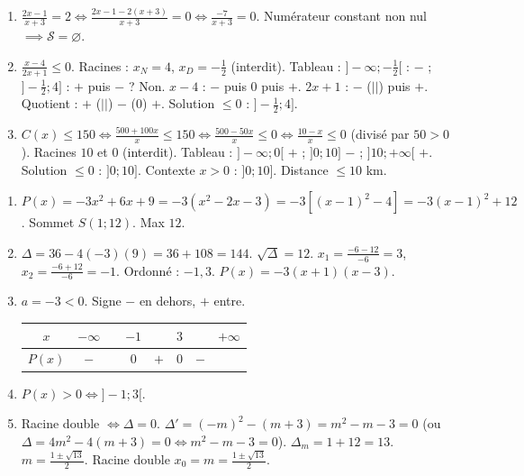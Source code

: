 \documentclass[11pt]{article}
\begin{document}
\begin{corrige}[Exercice 1]
    \begin{enumerate}
        \item $\frac{2x-1}{x+3}=2 \iff \frac{2x-1-2(x+3)}{x+3}=0 \iff \frac{-7}{x+3}=0$. Numérateur constant non nul $\implies \mathcal{S}=\varnothing$.
        \item $\frac{x-4}{2x+1} \le 0$. Racines : $x_N=4$, $x_D=-\frac{1}{2}$ (interdit). Tableau : $]-\infty; -\frac{1}{2}[$ : $-$ ; $]-\frac{1}{2}; 4]$ : $+$ puis $-$ ? Non. $x-4$ : $-$ puis $0$ puis $+$. $2x+1$ : $-$ ($||$) puis $+$. Quotient : $+$ ($||$) $-$ ($0$) $+$. Solution $\le 0$ : $]-\frac{1}{2}; 4]$.
        \item $C(x) \le 150 \iff \frac{500+100x}{x} \le 150 \iff \frac{500-50x}{x} \le 0 \iff \frac{10-x}{x} \le 0$ (divisé par $50>0$). Racines $10$ et $0$ (interdit). Tableau : $]-\infty;0[$ $+$ ; $]0;10]$ $-$ ; $]10;+\infty[$ $+$. Solution $\le 0$ : $]0;10]$. Contexte $x>0$ : $]0;10]$. Distance $\le 10$ km.
    \end{enumerate}
\end{corrige}

\begin{corrige}[Exercice 2]
    \begin{enumerate}
        \item $P(x)=-3x^2+6x+9 = -3(x^2-2x-3) = -3[(x-1)^2-4] = -3(x-1)^2+12$. Sommet $S(1;12)$. Max $12$.
        \item $\Delta = 36 - 4(-3)(9) = 36+108=144$. $\sqrt{\Delta}=12$. $x_1=\frac{-6-12}{-6}=3$, $x_2=\frac{-6+12}{-6}=-1$. Ordonné : $-1, 3$. $P(x)=-3(x+1)(x-3)$.
        \item $a=-3<0$. Signe $-$ en dehors, $+$ entre.
        \begin{tabular}{|c|ccccccc|}\hline $x$ & $-\infty$ & & $-1$ & & $3$ & & $+\infty$ \\ \hline $P(x)$ & $-$ & & $0$ & $+$ & $0$ & $-$ \\ \hline\end{tabular}
        \item $P(x)>0 \iff ]-1; 3[$.
        \item Racine double $\iff \Delta=0$. $\Delta' = (-m)^2 - (m+3) = m^2-m-3=0$ (ou $\Delta=4m^2-4(m+3)=0 \iff m^2-m-3=0$). $\Delta_m = 1+12=13$. $m = \frac{1\pm\sqrt{13}}{2}$. Racine double $x_0 = m = \frac{1\pm\sqrt{13}}{2}$.
    \end{enumerate}
\end{corrige}
\end{document}
